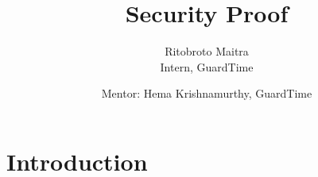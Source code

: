 \documentclass[10pt,a4paper]{article}
\author{Ritobroto Maitra\\Intern, GuardTime}
\title{Security Proof}
\date{Mentor: Hema Krishnamurthy, GuardTime}
\begin{document}
\maketitle
\section{Introduction}
\end{document}
